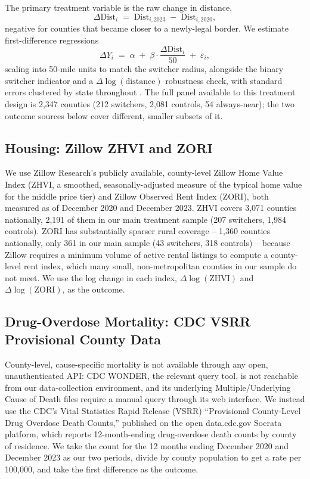 \documentclass[11pt]{article}
\begin{document}
The primary treatment variable is the raw change in distance,
\begin{equation}
  \Delta\text{Dist}_i \;=\; \text{Dist}_{i,2023} \;-\; \text{Dist}_{i,2020},
  \label{eq:distmi}
\end{equation}
negative for counties that became closer to a newly-legal border. We
estimate first-difference regressions
\begin{equation}
  \Delta Y_i \;=\; \alpha \;+\; \beta \cdot \frac{\Delta\text{Dist}_i}{50} \;+\; \varepsilon_i,
  \label{eq:distreg}
\end{equation}
scaling into 50-mile units to match the switcher radius, alongside the
binary switcher indicator and a $\Delta\log(\text{distance})$
robustness check, with standard errors clustered by state throughout
\citep{CameronMiller2015, BertrandDufloMullainathan2004}. The full
panel available to this treatment design is 2,347 counties (212
switchers, 2,081 controls, 54 always-near); the two outcome sources
below cover different, smaller subsets of it.

\subsection{Housing: Zillow ZHVI and ZORI}

We use Zillow Research's publicly available, county-level Zillow Home
Value Index (ZHVI, a smoothed, seasonally-adjusted measure of the
typical home value for the middle price tier) and Zillow Observed
Rent Index (ZORI), both measured as of December 2020 and December
2023. ZHVI covers 3,071 counties nationally, 2,191 of them in our
main treatment sample (207 switchers, 1,984 controls). ZORI has
substantially sparser rural coverage -- 1,360 counties nationally, only
361 in our main sample (43 switchers, 318 controls) -- because Zillow
requires a minimum volume of active rental listings to compute a
county-level rent index, which many small, non-metropolitan counties
in our sample do not meet. We use the log change in each index,
$\Delta \log(\text{ZHVI})$ and $\Delta \log(\text{ZORI})$, as the
outcome.

\subsection{Drug-Overdose Mortality: CDC VSRR Provisional County Data}

County-level, cause-specific mortality is not available through any
open, unauthenticated API: CDC WONDER, the relevant query tool, is not
reachable from our data-collection environment, and its underlying
Multiple/Underlying Cause of Death files require a manual query
through its web interface. We instead use the CDC's Vital Statistics
Rapid Release (VSRR) ``Provisional County-Level Drug Overdose Death
Counts,'' published on the open data.cdc.gov Socrata platform, which
reports 12-month-ending drug-overdose death counts by county of
residence. We take the count for the 12 months ending December 2020
and December 2023 as our two periods, divide by county population to
get a rate per 100,000, and take the first difference as the outcome.
\end{document}
